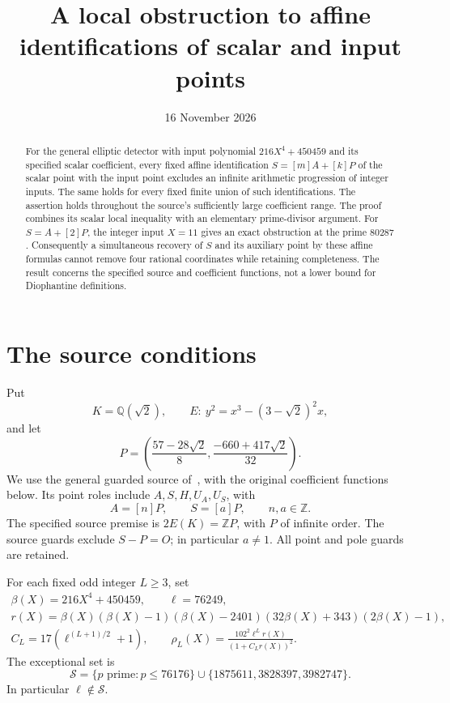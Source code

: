 \documentclass[11pt,a4paper]{article}
\title{A local obstruction to affine identifications of scalar and input points}
\author{}\date{16 November 2026}
\newcommand{\Q}{\mathbb Q}
\newcommand{\Z}{\mathbb Z}
\begin{document}
\maketitle
\begin{abstract}
For the general elliptic detector with input polynomial
$216X^4+450459$ and its specified scalar coefficient, every fixed
affine identification $S=[m]A+[k]P$ of the scalar point with the
input point excludes an infinite arithmetic progression of integer
inputs. The same holds for every fixed finite union of such
identifications. The assertion holds throughout the source's sufficiently
large coefficient range. The proof combines its scalar local
inequality with an elementary prime-divisor argument. For
$S=A+[2]P$, the integer input $X=11$ gives an exact obstruction
at the prime $80287$. Consequently a simultaneous recovery of
$S$ and its auxiliary point by these affine formulas cannot remove
four rational coordinates while retaining completeness. The result
concerns the specified source and coefficient functions, not a
lower bound for Diophantine definitions.
\end{abstract}

\section{The source conditions}

Put
\[
 K=\Q(\sqrt2),\qquad
 E:\ y^2=x^3-(3-\sqrt2)^2x,
\]
and let
\[
 P=\left(\frac{57-28\sqrt2}{8},
         \frac{-660+417\sqrt2}{32}\right).
\]
We use the general guarded source of~\cite[Section~3]{Unit}, with
the original coefficient functions below. Its point roles include
$A,S,H,U_A,U_S$, with
\[
                         A=[n]P,\qquad S=[a]P,
                         \qquad n,a\in\Z.
\]
The specified source premise is $2E(K)=\Z P$, with $P$ of infinite
order. The source guards exclude $S-P=O$; in particular $a\ne1$.
All point and pole guards are retained.

For each fixed odd integer $L\ge3$, set
\begin{equation}\label{eq:coefficient}
\begin{gathered}
 \beta(X)=216X^4+450459,\qquad \ell=76249,\\
 r(X)=\beta(X)(\beta(X)-1)(\beta(X)-2401)
                         (32\beta(X)+343)(2\beta(X)-1),\\
 C_L=17(\ell^{(L+1)/2}+1),\qquad
 \rho_L(X)=\frac{102^2\ell^L r(X)}{(1+C_Lr(X))^2}.
\end{gathered}
\end{equation}
The exceptional set is
\begin{equation}\label{eq:exceptional}
 \mathcal S=\{p\text{ prime}:p\le76176\}
                    \cup\{1875611,3828397,3982747\}.
\end{equation}
In particular $\ell\notin\mathcal S$.
\end{document}
